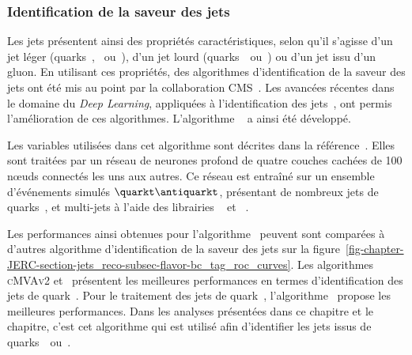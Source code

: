 \subsubsection{Identification de la saveur des jets}
Les jets présentent ainsi des propriétés caractéristiques, selon qu'il s'agisse d'un jet léger (quarks~\quarkd, \quarku\ ou~\quarks), d'un jet lourd (quarks~\quarkc\ ou~\quarkb) ou d'un jet issu d'un gluon.
En utilisant ces propriétés, des algorithmes d'identification de la saveur des jets ont été mis au point par la collaboration CMS~\cite{jet_btag_CSV_RunI}.
Les avancées récentes dans le domaine du \emph{Deep Learning}, appliquées à l'identification des jets~\cite{jet_flavor_deep_nn}, ont permis l'amélioration de ces algorithmes. L'algorithme \DeepCSV~\cite{Sirunyan_heavy_flavor_jets_2018} a ainsi été développé.
\par Les variables utilisées dans cet algorithme sont décrites dans la référence~\cite{Sirunyan_heavy_flavor_jets_2018}.
Elles sont traitées par un réseau de neurones profond de quatre couches cachées de 100 nœuds connectés les uns aux autres.
Ce réseau est entraîné sur un ensemble d'événements simulés $\quarkt\antiquarkt$, présentant de nombreux jets de quarks~\quarkb, et multi-jets à l'aide des librairies
\KERAS~\cite{keras}
et
\TENSORFLOW~\cite{tensorflow}.
\par Les performances ainsi obtenues pour l'algorithme \DeepCSV\ peuvent sont comparées à d'autres algorithme d'identification de la saveur des jets sur la figure~\ref{fig-chapter-JERC-section-jets_reco-subsec-flavor-bc_tag_roc_curves}.
Les algorithmes \textsc{cMVAv2} et \DeepCSV\ présentent les meilleures performances en termes d'identification des jets de quark~\quarkb.
Pour le traitement des jets de quark~\quarkc, l'algorithme \DeepCSV\ propose les meilleures performances.
Dans les analyses présentées dans ce chapitre et le chapitre, c'est cet algorithme qui est utilisé afin d'identifier les jets issus de quarks~\quarkc\ ou~\quarkb.
